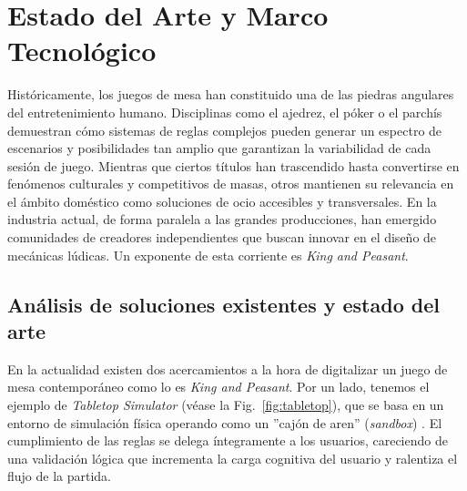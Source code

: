 \chapter{Estado del Arte y Marco Tecnológico}

\begin{abstract}
En este capítulo presenta el estado del arte y el marco tecnológico que sustenta el desarrollo de \textit{King and Peasant}. En primer lugar, se analizan las soluciones existentes en la digitalización de juegos de mesa, justificando la adopción de un modelo basado en la automatización de reglas frente a la simulación física. A continuación, se detalla y justifica la elección del \textit{stack} tecnológico, abordando la arquitectura de comunicación mediante \textit{WebSockets}, el entorno de ejecución asíncrono en \textit{Node.js}, el renderizado reactivo con \textit{React} y un sistema de persistencia dual basado en \textit{MariaDB} y \textit{Redis}. Finalmente, se expone la estrategia de contenedorización con \textit{Docker} y la política de pruebas automatizadas para garantizar la calidad y portabilidad del sistema.
\end{abstract}

Históricamente, los juegos de mesa han constituido una de las piedras angulares del entretenimiento humano. Disciplinas como el ajedrez, el póker o el parchís demuestran cómo sistemas de reglas complejos pueden generar un espectro de escenarios y posibilidades tan amplio que garantizan la variabilidad de cada sesión de juego. Mientras que ciertos títulos han trascendido hasta convertirse en fenómenos culturales y competitivos de masas, otros mantienen su relevancia en el ámbito doméstico como soluciones de ocio accesibles y transversales. En la industria actual, de forma paralela a las grandes producciones, han emergido comunidades de creadores independientes que buscan innovar en el diseño de mecánicas lúdicas. Un exponente de esta corriente es \textit{King and Peasant}.

\section{Análisis de soluciones existentes y estado del arte}

En la actualidad existen dos acercamientos a la hora de digitalizar un juego de mesa contemporáneo como lo es \textit{King and Peasant}. Por un lado, tenemos el ejemplo de \textit{Tabletop Simulator} (véase la Fig.~\ref{fig:tabletop}), que se basa en un entorno de simulación física operando como un ''cajón de aren'' (\textit{sandbox}) \cite{woods_eurogames}. El cumplimiento de las reglas se delega íntegramente a los usuarios, careciendo de una validación lógica que incrementa la carga cognitiva del usuario y ralentiza el flujo de la partida.

